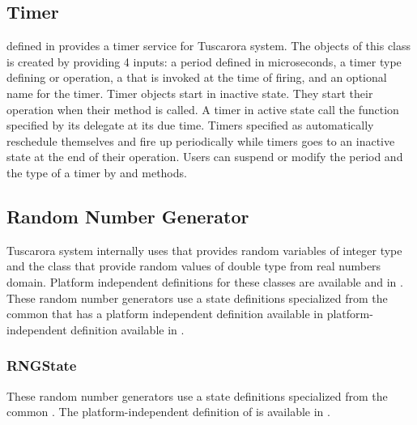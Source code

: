 \subsection{Timer}

 defined in  provides a timer service for Tuscarora system. The objects of this class is created by providing 4 inputs: 
a period defined in microseconds, 
a timer type defining  or  operation, 
a  that is invoked at the time of firing, 
and an optional name for the timer. 
Timer objects start in inactive state. They start their operation when their  method is called. 
A timer in active state call the function specified by its delegate at its due time. 
Timers specified as  automatically reschedule themselves and fire up periodically while  timers goes to an inactive state at the end of their operation. 
Users can suspend or modify the period and the type of a timer by  and  methods. 



\subsection{Random Number Generator}

Tuscarora system internally uses  that provides  random variables of integer type and the  class that provide random values of double type from real numbers domain. Platform independent definitions for these classes are available  and in . These random number generators use a state definitions specialized from the common  that has a platform independent definition available in platform-independent definition available in . 

\subsubsection{RNGState}

These random number generators use a state definitions specialized from the common .  The platform-independent definition of  is available in . 

